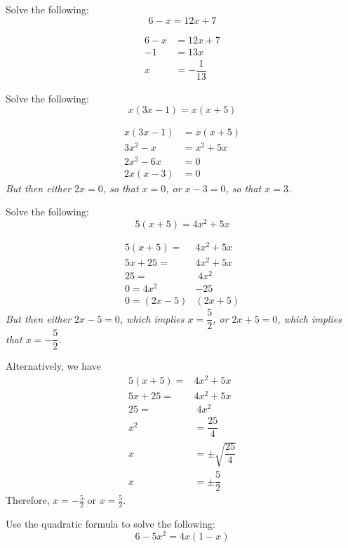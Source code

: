 \documentclass[12pt,letterpaper]{exam}
\begin{document}
\begin{questions}
\newpage
\question[10] Solve the following:
	\[
	6 - x= 12x + 7
	\] \pspace

	\[
	\begin{aligned}
	6 - x&= 12x + 7 \\[0.3cm]
	-1&= 13x \\[0.3cm]
	x&= -\dfrac{1}{13}
	\end{aligned}
	\] 



\newpage
\question[10] Solve the following:
	\[
	x(3x - 1)= x(x + 5)
	\] \pspace

{\itshape
	\[
	\begin{aligned}
	x(3x - 1)&= x(x + 5) \\[0.3cm]
	3x^2 - x&= x^2 + 5x \\[0.3cm]
	2x^2 - 6x&= 0 \\[0.3cm]
	2x(x - 3)&= 0
	\end{aligned}
	\] \pspace
But then either $2x= 0$, so that $x= 0$, or $x - 3=0$, so that $x= 3$. 
}



\newpage
\question[10] Solve the following:
	\[
	5(x + 5)= 4x^2 + 5x
	\] \pspace

{\itshape
	\[
	\begin{aligned}
	5(x + 5)=& 4x^2 + 5x \\[0.3cm]
	5x + 25=& 4x^2 + 5x \\[0.3cm]
	25= & \;4x^2 \\[0.3cm]
	0= 4x^2 &- 25 \\[0.3cm]
	0= (2x - 5)&(2x + 5)
	\end{aligned}
	\] \pspace
But then either $2x - 5= 0$, which implies $x= \dfrac{5}{2}$, or $2x + 5= 0$, which implies that $x= -\dfrac{5}{2}$. \pspace

Alternatively, we have
	\[
	\begin{aligned}
	5(x + 5)=& 4x^2 + 5x \\[0.3cm]
	5x + 25=& 4x^2 + 5x \\[0.3cm]
	25= & \;4x^2 \\[0.3cm]
	x^2&= \dfrac{25}{4} \\[0.3cm]
	x&= \pm \sqrt{\dfrac{25}{4}} \\[0.3cm]
	x&= \pm \dfrac{5}{2}
	\end{aligned}
	\] 
Therefore, $x= -\frac{5}{2}$ or $x= \frac{5}{2}$. 
}



\newpage
\question[10] Use the quadratic formula to solve the following:
	\[
	6 - 5x^2= 4x(1 - x)
	\] \pspace


\end{questions}
\end{document}
